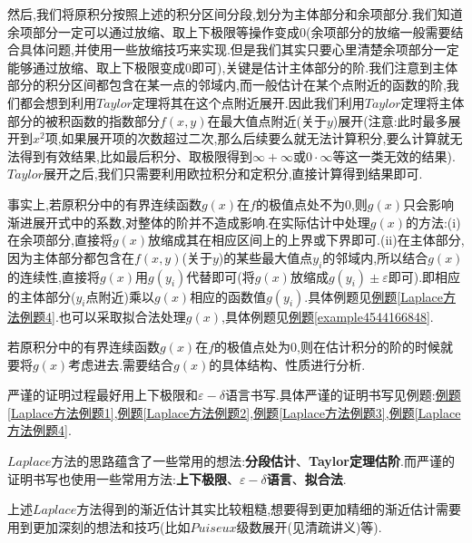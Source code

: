 \documentclass[../../main.tex]{subfiles}
\begin{document}
然后,我们将原积分按照上述的积分区间分段,划分为主体部分和余项部分.我们知道余项部分一定可以通过放缩、取上下极限等操作变成0(余项部分的放缩一般需要结合具体问题,并使用一些放缩技巧来实现.但是我们其实只要心里清楚余项部分一定能够通过放缩、取上下极限变成0即可),关键是估计主体部分的阶.我们注意到主体部分的积分区间都包含在某一点的邻域内,而一般估计在某个点附近的函数的阶,我们都会想到利用$Taylor$定理将其在这个点附近展开.因此我们利用$Taylor$定理将主体部分的被积函数的指数部分$f(x,y)$在最大值点附近(关于$y$)展开(注意:此时最多展开到$x^2$项,如果展开项的次数超过二次,那么后续要么就无法计算积分,要么计算就无法得到有效结果,比如最后积分、取极限得到$\infty+\infty$或$0\cdot \infty$等这一类无效的结果).
$Taylor$展开之后,我们只需要利用欧拉积分和定积分,直接计算得到结果即可.

事实上,若原积分中的有界连续函数$g(x)$在$f$的极值点处不为$0$,则$g(x)$只会影响渐进展开式中的系数,对整体的阶并不造成影响.在实际估计中处理$g(x)$的方法:(i)在余项部分,直接将$g(x)$放缩成其在相应区间上的上界或下界即可.(ii)在主体部分,因为主体部分都包含在$f(x,y)$(关于$y$)的某些最大值点$y_i$的邻域内,所以结合$g(x)$的连续性,直接将$g(x)$用$g(y_i)$代替即可(将$g(x)$放缩成$g(y_i)\pm \varepsilon$即可).即相应的主体部分($y_i$点附近)乘以$g(x)$相应的函数值$g(y_i)$.具体例题见\hyperref[Laplace方法例题4]{例题\ref{Laplace方法例题4}}.也可以采取拟合法处理$g(x)$,具体例题见\hyperref[example4544166848]{例题\ref{example4544166848}}.

若原积分中的有界连续函数$g(x)$在$f$的极值点处为$0$,则在估计积分的阶的时候就要将$g(x)$考虑进去.需要结合$g(x)$的具体结构、性质进行分析.

严谨的证明过程最好用上下极限和$\varepsilon-\delta$语言书写.具体严谨的证明书写见例题:\hyperref[Laplace方法例题1]{例题\ref{Laplace方法例题1}},\hyperref[Laplace方法例题2]{例题\ref{Laplace方法例题2}},\hyperref[Laplace方法例题3]{例题\ref{Laplace方法例题3}},\hyperref[Laplace方法例题4]{例题\ref{Laplace方法例题4}}.
\begin{note}
$Laplace$方法的思路蕴含了一些常用的想法:\textbf{分段估计}、\textbf{Taylor定理估阶}.而严谨的证明书写也使用一些常用方法:\textbf{上下极限}、\textbf{$\varepsilon-\delta$语言}、\textbf{拟合法}.
\end{note}
\begin{remark}
上述$Laplace$方法得到的渐近估计其实比较粗糙,想要得到更加精细的渐近估计需要用到更加深刻的想法和技巧(比如$Puiseux$级数展开(见清疏讲义)等).
\end{remark}
\end{document}
